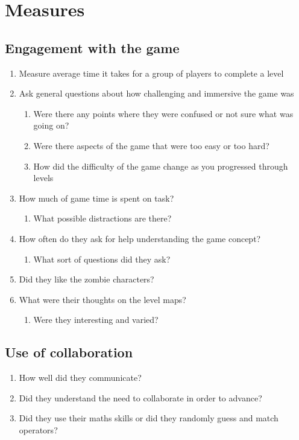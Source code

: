 \section{Measures}
\subsection{Engagement with the game}

\begin{enumerate}
\item Measure average time it takes for a group of players to complete a level

\item Ask general questions about how challenging and immersive the game was
\begin{enumerate}
    \item Were there any points where they were confused or not sure what was going on?
    \item Were there aspects of the game that were too easy or too hard?
    \item How did the difficulty of the game change as you progressed through levels
\end{enumerate}

\item How much of game time is spent on task?
\begin{enumerate}
    \item What possible distractions are there?
\end{enumerate}

\item How often do they ask for help understanding the game concept?
\begin{enumerate}
    \item What sort of questions did they ask?
\end{enumerate}

\item Did they like the zombie characters?

\item What were their thoughts on the level maps?
\begin{enumerate}
    \item Were they interesting and varied?
\end{enumerate}

\end{enumerate}

\subsection{Use of collaboration}
\begin{enumerate}

\item How well did they communicate?

\item Did they understand the need to collaborate in order to advance?

\item Did they use their maths skills or did they randomly guess and match operators?

\end{enumerate}

